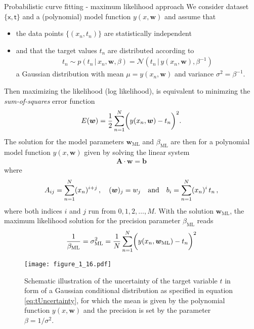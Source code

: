 \documentclass[11pt, DINA4, fleqn]{amsart}
\def\vw{\boldsymbol{w}\xspace}
\def\vb{\boldsymbol{b}\xspace}
\def\mA{\boldsymbol{A}\xspace}
\begin{document}
\begin{mybox_tc3}{Probabilistic curve fitting - maximum likelihood approach}
We consider dataset $\{\boldsymbol{\mathsf{x}}, \boldsymbol{\mathsf{t}}\}$
and a (polynomial) model function $y(x,\bm{w})$ and
assume that
\begin{itemize}
	\item the data points $\{(x_n, t_n)\}$ are statistically independent
	\item and that the target values $t_n$ are distributed according to
	\begin{align}
	t_n  \sim p(t_n \, | \, x_n, \bm{w}, \beta) = \mathcal{N}\left(
	t_n \, \bigl| \, y(x_n,\bm{w}), \beta^{-1}\right) 
	\end{align}
	a Gaussian distribution with mean $\mu = y(x_n, \bm{w})$ and variance $\sigma^2 = \beta^{-1}$.
\end{itemize}
	Then maximizing the likelihood (log likelihood), is equivalent to minimzing the \emph{sum-of-squares} error function
	\begin{align}
	E(\bm{w}) =\dfrac{1}{2} \sum\displaylimits_{n=1}^{N} \biggl(y(x_n, \bm{w}) - t_n\biggl)^2.
	\end{align}
The solution for the model parameters $\bm{w}_{\text{ML}}$ and $\beta_{\text{ML}}$ are then for a polynomial model function $y(x,\bm{w})$ given by
solving the linear system
\begin{align}
\mA \cdot \vw = \vb
\label{eq:linearSystem}
\end{align}
where
\begin{align}
A_{ij} = \sum \displaylimits_{n = 1}^{N} (x_n)^{i + j} \, , \quad
(\vw)_j = w_j \quad \text{and} \quad
b_i = \sum \displaylimits_{n = 1}^{N} (x_n)^{i} \, t_n \, ,
\end{align}
where both indices $i$ and $j$ run from $0, 1, 2, \dotsc, M$.
With the solution $\bm{w}_{\text{ML}}$, the maximum likelihood solution for the precision parameter $\beta_{\text{ML}}$ reads
\begin{align}
\dfrac{1}{\beta_{\text{ML}}} = \sigma^2_{\text{ML}}= \dfrac{1}{N} \sum\displaylimits_{n=1}^{N} \biggl(y(x_n, \bm{w}_{\text{ML}}) - t_n\biggl)^2
\end{align}
\end{mybox_tc3}

\begin{figure}[h]
	\centering
	\texttt{[image: figure\_1\_16.pdf]}
	\caption{Schematic illustration of the uncertainty of the target variable $t$ in form of a Gaussian conditional distribution as specified in equation \eqref{eq:tUncertainty}, for which the mean is given by the polynomial function $y(x,\bm{w})$ and the precision is set by the parameter $\beta = 1/\sigma^2$.
		\label{fig:figure_1_16}}
\end{figure}
\end{document}
